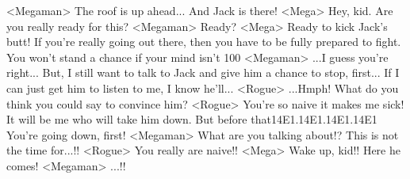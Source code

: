 <Megaman> The roof is up ahead... And Jack is there! 
<Mega> Hey, kid. 
Are you really ready for this? 
<Megaman> Ready? 
<Mega> Ready to kick Jack's butt! 
If you're really going out there, then you have to be fully prepared to fight. 
You won't stand a chance if your mind isn't 100%
<Megaman> ...I guess you're right... 
But, I still want to talk to Jack and give him a chance to stop, first... 
If I can just get him to listen to me, I know he'll... 
<Rogue> ...Hmph! 
What do you think you could say to convince him? 
<Rogue> You're so naive it makes me sick! 
It will be me who will take him down. 
But before that{14}{E1}.{14}{E1}.{14}{E1}.{14}{E1} You're going down, first! 
<Megaman> What are you talking about!? This is not the time for...!! 
<Rogue> You really are naive!! 
<Mega> Wake up, kid!! 
Here he comes! 
<Megaman> ...!! 
